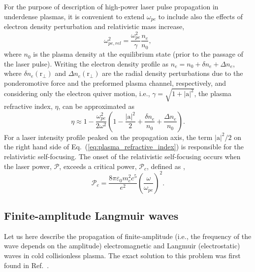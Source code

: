 \documentclass[10pt, a4paper, twoside, openright]{report}
\newcommand{\norm}[1]{|#1|}
\renewcommand{\vec}[1]{\boldsymbol{\mathrm{#1}}}
\begin{document}
For the purpose of description of high-power laser pulse propagation in underdense plasmas, it is convenient to extend $ \omega_{pe} $ to include also the effects of electron density perturbation and relativistic mass increase,
\begin{equation}\label{eq:langmuir_freq_rel}
	\omega_{pe, rel}^2 = \frac{\omega_{pe}^2}{\gamma} \frac{n_e}{n_0},
\end{equation}
where $ n_0 $ is the plasma density at the equilibrium state (prior to the passage of the laser pulse). Writing the electron density profile as $ n_e = n_0 + \delta n_e + \Delta n_e $, where $ \delta n_e \left( \vec{r}_{\bot} \right) $ and $ \Delta n_e \left( \vec{r}_{\bot} \right) $ are the radial density perturbations due to the ponderomotive force and the preformed plasma channel, respectively, and considering only the electron quiver motion, i.e., $ \gamma = \sqrt{1 + \norm{\vec{a}}^2} $, the plasma refractive index, $ \eta $, can be approximated as \cite{Esarey1997}
\begin{equation}\label{eq:plasma_refractive_index}
	\eta \approx 1 - \frac{\omega_{pe}^2}{2 \omega^2} \left( 1 - \frac{\norm{\vec{a}}^2}{2} + \frac{\delta n_e}{n_0} + \frac{\Delta n_e}{n_0} \right).
\end{equation}
For a laser intensity profile peaked on the propagation axis, the term $ \norm{\vec{a}}^2 / 2 $ on the right hand side of Eq.~(\ref{eq:plasma_refractive_index}) is responsible for the relativistic self-focusing. The onset of the relativistic self-focusing occurs when the laser power, $ \mathcal{P} $, exceeds a critical power, $ \mathcal{P}_c $, defined as \cite{Sun1987},
\begin{equation}\label{eq:critical_power}
	\mathcal{P}_c = \frac{8 \pi \varepsilon_0 m_e^2 c^5}{e^2} \left( \frac{\omega}{\omega_{pe}} \right)^2.
\end{equation}

\subsection{Finite-amplitude Langmuir waves\label{sec:langmuir_waves}}
%

Let us here describe the propagation of finite-amplitude (i.e., the frequency of the wave depends on the amplitude) electromagnetic and Langmuir (electrostatic) waves in cold collisionless plasma. The exact solution to this problem was first found in Ref.~.
\end{document}
